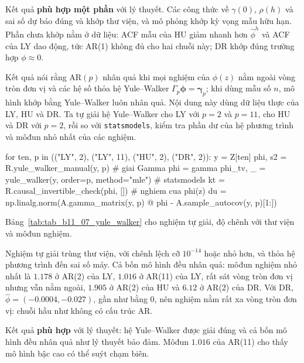  Kết quả \textbf{phù hợp một phần} với lý thuyết. Các công thức về $\gamma(0)$, $\rho(h)$ và sai số dự báo đúng và khớp thư viện, và mô phỏng khớp kỳ vọng mẫu hữu hạn. Phần chưa khớp nằm ở dữ liệu: ACF mẫu của HU giảm nhanh hơn $\hat\phi^h$ và ACF của LY dao động, tức AR(1) không đủ cho hai chuỗi này; DR khớp đúng trường hợp $\phi\approx0$.

 Kết quả  nói rằng AR$(p)$ nhân quả khi mọi nghiệm của $\phi(z)$ nằm ngoài vòng tròn đơn vị và các hệ số thỏa hệ Yule--Walker $\Gamma_p\boldsymbol\phi=\boldsymbol\gamma_p$; khi dùng mẫu số $n$, mô hình khớp bằng Yule--Walker luôn nhân quả.
 Nội dung này dùng dữ liệu thực của LY, HU và DR. Ta tự giải hệ Yule--Walker cho LY với $p=2$ và $p=11$, cho HU và DR với $p=2$, rồi so với \texttt{statsmodels}, kiểm tra phần dư của hệ phương trình và môđun nhỏ nhất của các nghiệm.
\begin{codeblock}
for ten, p in (("LY", 2), ("LY", 11), ("HU", 2), ("DR", 2)):
    y = Z[ten]
    phi, s2 = R.yule_walker_manual(y, p)                    # giai Gamma phi = gamma
    phi_tv, _ = yule_walker(y, order=p, method="mle")       # statsmodels
    kt = R.causal_invertible_check(phi, [])                 # nghiem cua phi(z)
    du = np.linalg.norm(A.gamma_matrix(y, p) @ phi - A.sample_autocov(y, p)[1:])
\end{codeblock}
 Bảng~\ref{tab:tab_b11_07_yule_walker} cho nghiệm tự giải, độ chênh với thư viện và môđun nghiệm.

 Nghiệm tự giải trùng thư viện, với chênh lệch cỡ $10^{-14}$ hoặc nhỏ hơn, và thỏa hệ phương trình đến sai số máy. Cả bốn mô hình đều nhân quả: môđun nghiệm nhỏ nhất là $1.178$ ở AR(2) của LY, $1.016$ ở AR(11) của LY, rất sát vòng tròn đơn vị nhưng vẫn nằm ngoài, $1.905$ ở AR(2) của HU và $6.12$ ở AR(2) của DR. Với DR, $\hat\phi=(-0.0004,-0.027)$, gần như bằng $0$, nên nghiệm nằm rất xa vòng tròn đơn vị: chuỗi hầu như không có cấu trúc AR.

 Kết quả \textbf{phù hợp} với lý thuyết: hệ Yule--Walker được giải đúng và cả bốn mô hình đều nhân quả như lý thuyết bảo đảm. Môđun $1.016$ của AR(11) cho thấy mô hình bậc cao có thể suýt chạm biên.

